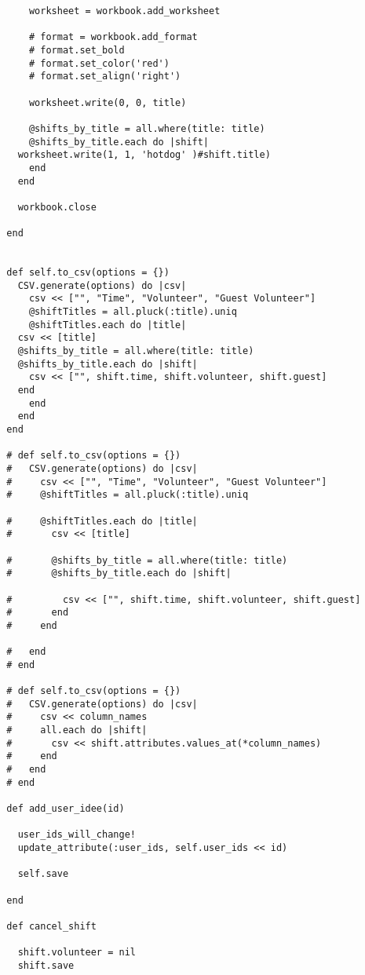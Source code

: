 \documentclass[11pt]{article}
\begin{document}
\begin{itemize}
\begin{itemize}
\begin{itemize}
\begin{verbatim}
      worksheet = workbook.add_worksheet

      # format = workbook.add_format
      # format.set_bold
      # format.set_color('red')
      # format.set_align('right')

      worksheet.write(0, 0, title) 

      @shifts_by_title = all.where(title: title)      
      @shifts_by_title.each do |shift|
	worksheet.write(1, 1, 'hotdog' )#shift.title)
      end
    end

    workbook.close

  end


  def self.to_csv(options = {})
    CSV.generate(options) do |csv|
      csv << ["", "Time", "Volunteer", "Guest Volunteer"]
      @shiftTitles = all.pluck(:title).uniq
      @shiftTitles.each do |title|
	csv << [title]
	@shifts_by_title = all.where(title: title)
	@shifts_by_title.each do |shift|
	  csv << ["", shift.time, shift.volunteer, shift.guest]
	end
      end
    end
  end

  # def self.to_csv(options = {})
  #   CSV.generate(options) do |csv|
  #     csv << ["", "Time", "Volunteer", "Guest Volunteer"]
  #     @shiftTitles = all.pluck(:title).uniq

  #     @shiftTitles.each do |title|
  #       csv << [title]

  #       @shifts_by_title = all.where(title: title)
  #       @shifts_by_title.each do |shift|

  #         csv << ["", shift.time, shift.volunteer, shift.guest]
  #       end
  #     end

  #   end
  # end

  # def self.to_csv(options = {})
  #   CSV.generate(options) do |csv|
  #     csv << column_names
  #     all.each do |shift|
  #       csv << shift.attributes.values_at(*column_names)
  #     end
  #   end
  # end

  def add_user_idee(id)

    user_ids_will_change!
    update_attribute(:user_ids, self.user_ids << id)

    self.save

  end

  def cancel_shift

    shift.volunteer = nil
    shift.save


\end{verbatim}
\end{itemize}
\end{itemize}
\end{itemize}
\end{document}
